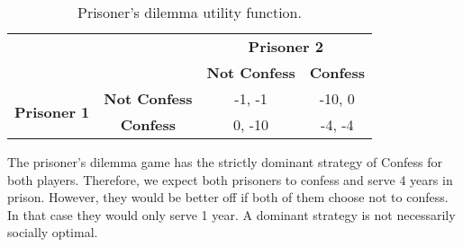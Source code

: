 \documentclass[twoside]{article}
\begin{document}
\begin{table}[ht]
\begin{center}
\caption{Prisoner's dilemma utility function.}
\label{table:prisoner}
\begin{tabular}{l l p{7em} p{7em}}
                                                        &                                            & \multicolumn{2}{c}{\textbf{Prisoner 2}}                    \\
                                                        &                                            & \textbf{Not Confess}       & \textbf{Confess}               \\ \cline{3-4} 
\multicolumn{1}{c}{\multirow{2}{*}{\textbf{Prisoner 1}}} & \multicolumn{1}{c|}{\textbf{Not Confess}} & \multicolumn{1}{c|}{-1, -1} & \multicolumn{1}{c|}{-10, 0} \\ \cline{3-4} 
\multicolumn{1}{c}{}                                    & \multicolumn{1}{c|}{\textbf{Confess}}         & \multicolumn{1}{c|}{0, -10} & \multicolumn{1}{c|}{-4, -4} \\ \cline{3-4} 
\end{tabular}
\end{center}
\end{table}

The prisoner's dilemma game has the strictly dominant strategy of Confess for both players. Therefore, we expect both prisoners to confess and serve 4 years in prison. However, they would be better off if both of them choose not to confess. In that case they would only serve 1 year. A dominant strategy is not necessarily socially optimal.
\end{document}
